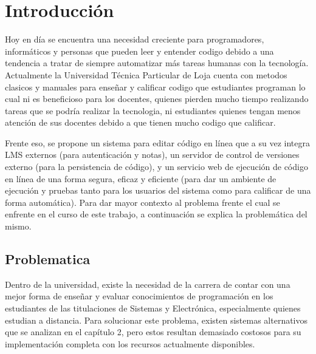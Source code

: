 
\chapter{Introducción}
\label{capitulo1}

%


\newcommand{\keyword}[1]{\textbf{#1}}
\newcommand{\tabhead}[1]{\textbf{#1}}
\newcommand{\code}[1]{\texttt{#1}}
\newcommand{\file}[1]{\texttt{\bfseries#1}}
\newcommand{\option}[1]{\texttt{\itshape#1}}


Hoy en día se encuentra una necesidad creciente para programadores, informáticos y personas que pueden leer y entender codigo debido a una tendencia a tratar de siempre automatizar más tareas humanas con la tecnología. Actualmente la Universidad Técnica Particular de Loja cuenta con metodos clasicos y manuales para enseñar y calificar codigo que estudiantes programan lo cual ni es beneficioso para los docentes, quienes pierden mucho tiempo realizando tareas que se podría realizar la tecnologia, ni estudiantes quienes tengan menos atención de sus docentes debido a que tienen mucho codigo que calificar.

Frente eso, se propone un sistema para editar código en línea que a su vez integra LMS externos (para autenticación y notas), un servidor de control de versiones externo (para la persistencia de código), y un servicio web de ejecución de código en línea de una forma segura, eficaz y eficiente (para dar un ambiente de ejecución y pruebas tanto para los usuarios del sistema como para calificar de una forma automática). Para dar mayor contexto al problema frente el cual se enfrente en el curso de este trabajo, a continuación se explica la problemática del mismo.

\section{Problematica}
Dentro de la universidad, existe la necesidad de la carrera de contar con una mejor forma de enseñar y evaluar conocimientos de programación en los estudiantes de las titulaciones de Sistemas y Electrónica, especialmente quienes estudian a distancia. Para solucionar este problema, existen sistemas alternativos que se analizan en el capítulo 2, pero estos resultan demasiado costosos para su implementación completa con los recursos actualmente disponibles.

